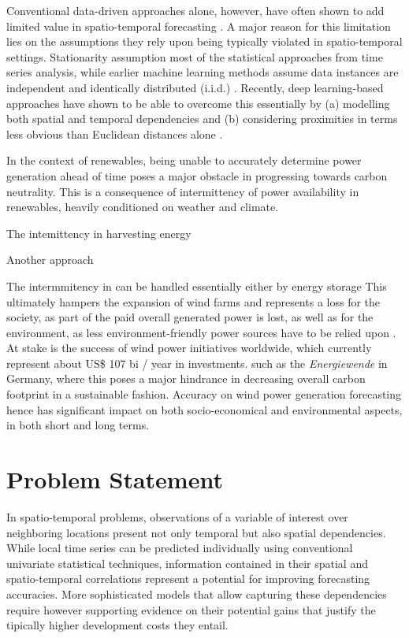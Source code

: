 Conventional data-driven approaches alone, however, have often shown to add limited value in spatio-temporal forecasting \cite{makridakis2018waysforward}.
A major reason for this limitation lies on the assumptions they rely upon being typically violated in spatio-temporal settings.
Stationarity assumption most of the statistical approaches from time series analysis, while earlier machine learning methods assume data instances are independent and identically distributed (i.i.d.) \cite{atluri2018datamining}.
Recently, deep learning-based approaches have shown to be able to overcome this essentially by (a) modelling both spatial and temporal dependencies and (b) considering proximities in terms less obvious than Euclidean distances alone \cite{li2018dcrnn, liu2019st-mgcn, wu2019graphwavenet}.

In the context of renewables, being unable to accurately determine power generation ahead of time poses a major obstacle in progressing towards carbon neutrality.
This is a consequence of intermittency of power availability in renewables, heavily conditioned on weather and climate.


The intemittency in harvesting energy


Another approach

The intermmitency in  can be handled essentially either by energy storage
This ultimately hampers the expansion of wind farms and represents a loss for the society, as part of the paid overall generated power is lost, as well as for the environment, as less environment-friendly power sources have to be relied upon \cite{delarue2015intermittency}.
At stake is the success of wind power initiatives worldwide, which currently represent about US\$ 107 bi / year in investments.
such as the \textit{Energiewende} in Germany, where  this poses a major hindrance in decreasing overall carbon footprint in a sustainable fashion.
Accuracy on wind power generation forecasting hence has significant impact on both socio-economical and environmental aspects, in both short and long terms.

\section{Problem Statement}
In spatio-temporal problems, observations of a variable of interest over neighboring locations present not only temporal but also spatial dependencies.
While local time series can be predicted individually using conventional univariate statistical techniques, information contained in their spatial and spatio-temporal correlations represent a potential for improving forecasting accuracies.
More sophisticated models that allow capturing these dependencies require however supporting evidence on their potential gains that justify the tipically higher development costs they entail.

